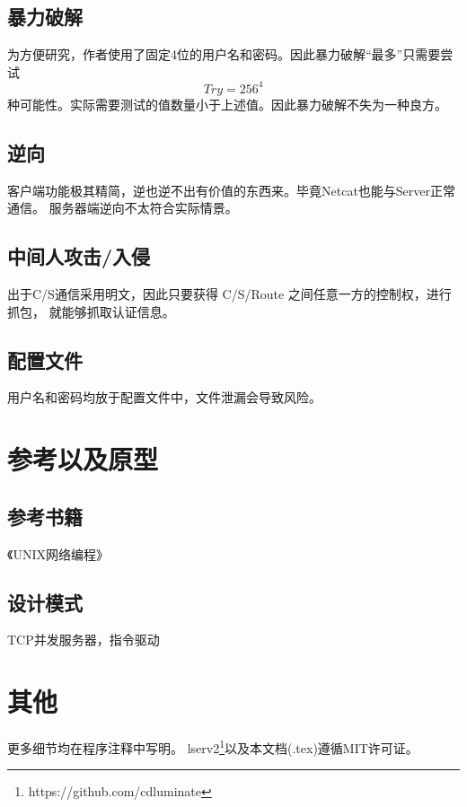 \documentclass[a4paper,12pt]{article}
\begin{document}
\begin{CJK}{UTF8}{gbsn}
	\subsection{暴力破解}
		为方便研究，作者使用了固定4位的用户名和密码。因此暴力破解“最多”只需要尝试
		\begin{equation}
Try = 256^{4}
		\end{equation}
		种可能性。实际需要测试的值数量小于上述值。因此暴力破解不失为一种良方。
	\subsection{逆向}
		客户端功能极其精简，逆也逆不出有价值的东西来。毕竟Netcat也能与Server正常通信。
		服务器端逆向不太符合实际情景。
	\subsection{中间人攻击/入侵}
		出于C/S通信采用明文，因此只要获得 C/S/Route 之间任意一方的控制权，进行抓包，
		就能够抓取认证信息。
	\subsection{配置文件}
		用户名和密码均放于配置文件中，文件泄漏会导致风险。

\section{参考以及原型}
	\subsection{参考书籍}
		《UNIX网络编程》
	\subsection{设计模式}
		TCP并发服务器，指令驱动

\section{其他}
	更多细节均在程序注释中写明。
	lserv2\footnote{https://github.com/cdluminate}以及本文档(.tex)遵循MIT许可证。

\end{CJK}
\end{document}
